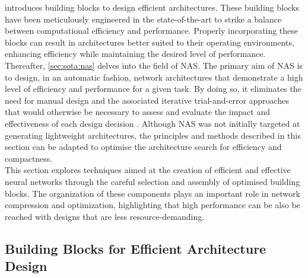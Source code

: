  introduces building blocks to design efficient
architectures. These building blocks have been meticulously engineered in the
state-of-the-art to strike a balance between computational efficiency and
performance. Properly incorporating these blocks can result in architectures
better suited to their operating environments, enhancing efficiency while
maintaining the desired level of performance.\\

Thereafter, \cref{sec:sota:nas} delves into the field of \acl{NAS}. The primary
aim of \ac{NAS} is to design, in an automatic fashion, network architectures
that demonstrate a high level of efficiency and performance for a given task. By
doing so, it eliminates the need for manual design and the associated iterative
trial-and-error approaches that would otherwise be necessary to assess and
evaluate the impact and effectiveness of each design decision
\cite{DBLP:journals/corr/HowardZCKWWAA17,DBLP:conf/cvpr/SandlerHZZC18,DBLP:conf/iccv/HowardPALSCWCTC19}.
Although \ac{NAS} was not initially targeted at generating lightweight
architectures, the principles and methods described in this section can be
adapted to optimise the architecture search for efficiency and compactness. \\

This section explores techniques aimed at the creation of efficient and
effective neural networks through the careful selection and assembly of
optimised building blocks. The organization of these components plays an
important role in network compression and optimization, highlighting that high
performance can be also be reached with designs that are less
resource-demanding.\\

\subsection{Building Blocks for Efficient Architecture Design}\label{sec:sota:efficient_archi}

